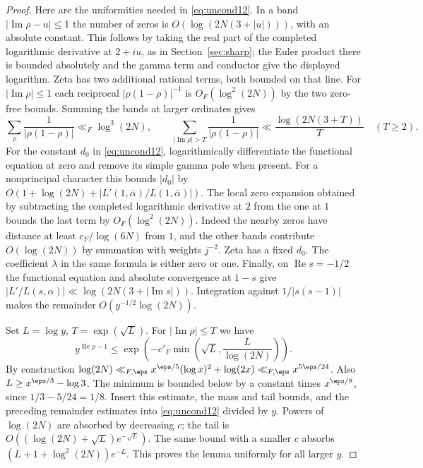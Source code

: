 \documentclass[a4paper,11pt]{article}
\theoremstyle{definition}
\theoremstyle{remark}
\newcommand{\real}{\operatorname{Re}}\newcommand{\imag}{\operatorname{Im}}
\numberwithin{equation}{section}
\begin{document}
\begin{proof}
Here are the uniformities needed in \eqref{eq:uncond12}. In a band \(|\imag\rho-u|\le1\) the number of zeros is \(O(\log(2N(3+|u|)))\), with an absolute constant. This follows by taking the real part of the completed logarithmic derivative at \(2+iu\), as in Section~\ref{sec:sharp}; the Euler product there is bounded absolutely and the gamma term and conductor give the displayed logarithm. Zeta has two additional rational terms, both bounded on that line. For \(|\imag\rho|\le1\) each reciprocal \(|\rho(1-\rho)|^{-1}\) is \(O_F(\log^2(2N))\) by the two zero-free bounds. Summing the bands at larger ordinates gives
\[
  \sum_\rho\frac{1}{|\rho(1-\rho)|}\ll_F\log^3(2N),\qquad
  \sum_{|\imag\rho|>T}\frac{1}{|\rho(1-\rho)|}
       \ll\frac{\log(2N(3+T))}{T}\quad(T\ge2).
\]
For the constant \(d_0\) in \eqref{eq:uncond12}, logarithmically differentiate the functional equation at zero and remove its simple gamma pole when present. For a nonprincipal character this bounds \(|d_0|\) by \(O(1+\log(2N)+|L'(1,\bar\alpha)/L(1,\bar\alpha)|)\). The local zero expansion obtained by subtracting the completed logarithmic derivative at \(2\) from the one at \(1\) bounds the last term by \(O_F(\log^2(2N))\). Indeed the nearby zeros have distance at least \(c_F/\log(6N)\) from \(1\), and the other bands contribute \(O(\log(2N))\) by summation with weights \(j^{-2}\). Zeta has a fixed \(d_0\). The coefficient \(\lambda\) in the same formula is either zero or one. Finally, on \(\real s=-1/2\) the functional equation and absolute convergence at \(1-s\) give \(|L'/L(s,\alpha)|\ll\log(2N(3+|\imag s|))\). Integration against \(1/|s(s-1)|\) makes the remainder \(O(y^{-1/2}\log(2N))\).

Set \(L=\log y\), \(T=\exp(\sqrt L)\). For \(|\imag\rho|\le T\) we have
\[
 y^{\real\rho-1}
 \le \exp\!\left(-c'_F\min\!\left(\sqrt L,\frac{L}{\log(2N)}\right)\right).
\]
By construction \(\log(2N)\ll_{F,\eps} x^{\eps/5}(\log x)^2+\log(2x)
\ll_{F,\eps} x^{5\eps/24}\). Also \(L\ge x^{\eps/3}-\log3\). The minimum is bounded below by a constant times \(x^{\eps/8}\), since \(1/3-5/24=1/8\). Insert this estimate, the mass and tail bounds, and the preceding remainder estimates into \eqref{eq:uncond12} divided by \(y\). Powers of \(\log(2N)\) are absorbed by decreasing \(c\); the tail is \(O((\log(2N)+\sqrt L)e^{-\sqrt L})\). The same bound with a smaller \(c\) absorbs \((L+1+\log^2(2N))e^{-L}\). This proves the lemma uniformly for all larger \(y\).
\end{proof}
\end{document}
